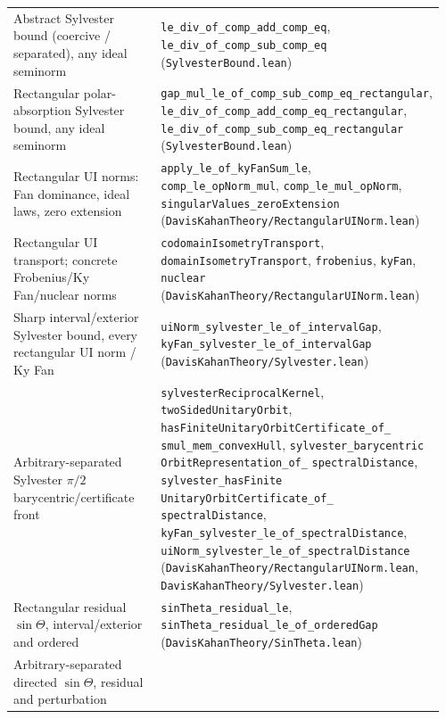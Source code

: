 \documentclass[11pt]{article}
\theoremstyle{remark}
\begin{document}
\begin{center}
\begin{tabular}{@{}p{0.40\linewidth}p{0.56\linewidth}@{}}
Abstract Sylvester bound (coercive / separated), any ideal seminorm
  & \texttt{le\_div\_of\_comp\_add\_comp\_eq},
    \texttt{le\_div\_of\_comp\_sub\_comp\_eq} (\texttt{SylvesterBound.lean}) \\
Rectangular polar-absorption Sylvester bound, any ideal seminorm
  & \texttt{gap\_mul\_le\_of\_comp\_sub\_comp\_eq\_rectangular},
    \texttt{le\_div\_of\_comp\_add\_comp\_eq\_rectangular},
    \texttt{le\_div\_of\_comp\_sub\_comp\_eq\_rectangular}
    (\texttt{SylvesterBound.lean}) \\
Rectangular UI norms: Fan dominance, ideal laws, zero extension
  & \texttt{apply\_le\_of\_kyFanSum\_le},
    \texttt{comp\_le\_opNorm\_mul}, \texttt{comp\_le\_mul\_opNorm},
    \texttt{singularValues\_zeroExtension}
    (\texttt{DavisKahanTheory/RectangularUINorm.lean}) \\
Rectangular UI transport; concrete Frobenius/Ky Fan/nuclear norms
  & \texttt{codomainIsometryTransport}, \texttt{domainIsometryTransport},
    \texttt{frobenius}, \texttt{kyFan}, \texttt{nuclear}
    (\texttt{DavisKahanTheory/RectangularUINorm.lean}) \\
Sharp interval/exterior Sylvester bound, every rectangular UI norm / Ky Fan
  & \texttt{uiNorm\_sylvester\_le\_of\_}\allowbreak\texttt{intervalGap},
    \texttt{kyFan\_sylvester\_le\_of\_}\allowbreak\texttt{intervalGap}
    (\texttt{DavisKahanTheory/Sylvester.lean}) \\
Arbitrary-separated Sylvester $\pi/2$ barycentric/certificate front
  & \texttt{sylvesterReciprocalKernel},
    \texttt{twoSidedUnitaryOrbit},
    \texttt{hasFiniteUnitaryOrbitCertificate\_of\_}\allowbreak
      \texttt{smul\_mem\_convexHull},
    \texttt{sylvester\_barycentric}\allowbreak
      \texttt{OrbitRepresentation\_of\_}\allowbreak
      \texttt{spectralDistance},
    \texttt{sylvester\_hasFinite}\allowbreak
      \texttt{UnitaryOrbitCertificate\_of\_}\allowbreak
      \texttt{spectralDistance},
    \texttt{kyFan\_sylvester\_le\_of\_}\allowbreak\texttt{spectralDistance},
    \texttt{uiNorm\_sylvester\_le\_of\_}\allowbreak\texttt{spectralDistance}
    (\texttt{DavisKahanTheory/RectangularUINorm.lean},
     \texttt{DavisKahanTheory/Sylvester.lean}) \\
Rectangular residual $\sin\Theta$, interval/exterior and ordered
  & \texttt{sinTheta\_residual\_le},
    \texttt{sinTheta\_residual\_le\_of\_orderedGap}
    (\texttt{DavisKahanTheory/SinTheta.lean}) \\
Arbitrary-separated directed $\sin\Theta$, residual and perturbation

\end{tabular}
\end{center}
\end{document}
